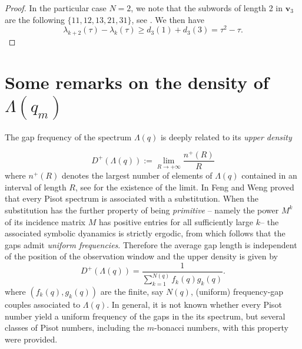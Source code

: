 \documentclass{amsart}
\newtheorem{remark}[theorem]{Remark}
\begin{document}
\begin{proof}
In the particular case $N=2$, we note that the subwords of length 2 in $\mathbf v_3$ are the following $\{11,12,13,21,31\}$, see \cite{seminalrauzy}. We then have
$$\lambda_{k+2}(\tau)-\lambda_k(\tau)\geq d_3(1)+d_3(3)=\tau^2-\tau.$$
\end{proof}


\section{Some remarks on the density of $\Lambda(q_m)$}\label{sec4}

The gap frequency of the spectrum $\Lambda(q)$ is deeply related to its \emph{upper density} \cite{beu}

\begin{equation*}
D^+(\Lambda(q)) := \lim_{R\to +\infty} \frac{n^+(R)}{R}
\end{equation*}
where $n^+(R)$ denotes the largest number of elements of $\Lambda(q)$ contained in an interval of length $R$, see \cite{komlorbook} for the existence of the limit. In \cite{FW02} Feng and Weng proved that every Pisot spectrum is associated with a substitution. When the substitution has the further property of being \emph{primitive} -- namely the power $M^k$ of its incidence matrix $M$ has positive entries for all sufficiently large $k$--  the associated symbolic dyanamics is strictly ergodic, from which follows that the gaps admit \emph{uniform frequencies}. Therefore the average gap length is independent of the position of the observation window and the upper density is given by
\begin{equation}\label{density}
D^+(\Lambda(q)) =\frac{1}{\sum_{k=1}^{N(q)} f_k(q)g_k(q)}.
\end{equation}
where $(f_k(q),g_k(q))$ are the finite, say $N(q)$, (uniform) frequency-gap couples associated to $\Lambda(q)$. In general, it is not known whether every Pisot number yield a uniform frequency of the gaps in the its spectrum, but several classes of Pisot numbers, including the $m$-bonacci numbers, with this property were provided.  
\end{document}
